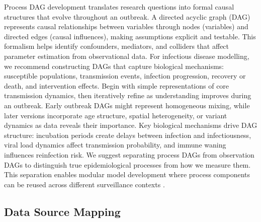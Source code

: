 \documentclass{article}
\begin{document}
Process DAG development translates research questions into formal causal structures that evolve throughout an outbreak.
A directed acyclic graph (DAG) represents causal relationships between variables through nodes (variables) and directed edges (causal influences), making assumptions explicit and testable.
This formalism helps identify confounders, mediators, and colliders that affect parameter estimation from observational data.
For infectious disease modelling, we recommend constructing DAGs that capture biological mechanisms: susceptible populations, transmission events, infection progression, recovery or death, and intervention effects.
Begin with simple representations of core transmission dynamics, then iteratively refine as understanding improves during an outbreak.
Early outbreak DAGs might represent homogeneous mixing, while later versions incorporate age structure, spatial heterogeneity, or variant dynamics as data reveals their importance.
Key biological mechanisms drive DAG structure: incubation periods create delays between infection and infectiousness, viral load dynamics affect transmission probability, and immune waning influences reinfection risk.
We suggest separating process DAGs from observation DAGs to distinguish true epidemiological processes from how we measure them.
This separation enables modular model development where process components can be reused across different surveillance contexts \citep{nicholson2022interoperability}.

\subsection{Data Source Mapping}
\end{document}
